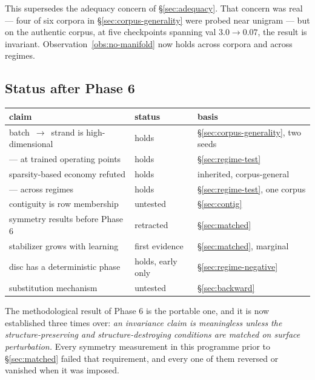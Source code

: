 This supersedes the adequacy concern of \S\ref{sec:adequacy}. That concern was
real --- four of six corpora in \S\ref{sec:corpus-generality} were probed near
unigram --- but on the authentic corpus, at five checkpoints spanning val
$3.0\to0.07$, the result is invariant. Observation~\ref{obs:no-manifold} now
holds across corpora and across regimes.

\subsection{Status after Phase 6}
\label{sec:phase6-status}

\begin{center}
\begin{tabular}{lll}
\hline
claim & status & basis \\
\hline
batch~$\to$~strand is high-dimensional & holds & \S\ref{sec:corpus-generality}, two seeds \\
\quad --- at trained operating points & holds & \S\ref{sec:regime-test} \\
sparsity-based economy refuted & holds & inherited, corpus-general \\
\quad --- across regimes & holds & \S\ref{sec:regime-test}, one corpus \\
contiguity is row membership & untested & \S\ref{sec:contig} \\
symmetry results before Phase 6 & retracted & \S\ref{sec:matched} \\
stabilizer grows with learning & first evidence & \S\ref{sec:matched}, marginal \\
disc has a deterministic phase & holds, early only & \S\ref{sec:regime-negative} \\
substitution mechanism & untested & \S\ref{sec:backward} \\
\hline
\end{tabular}
\end{center}

The methodological result of Phase 6 is the portable one, and it is now
established three times over: \emph{an invariance claim is meaningless unless
the structure-preserving and structure-destroying conditions are matched on
surface perturbation.} Every symmetry measurement in this programme prior to
\S\ref{sec:matched} failed that requirement, and every one of them reversed or
vanished when it was imposed.
